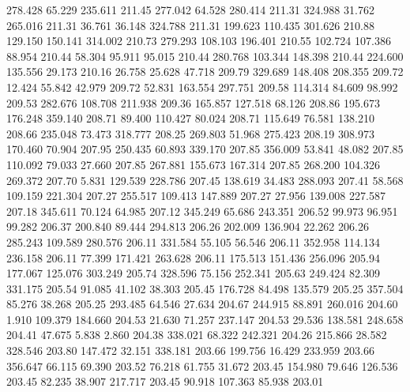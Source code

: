  278.428   65.229  235.611       211.45
 277.042   64.528  280.414       211.31
 324.988   31.762  265.016       211.31
  36.761   36.148  324.788       211.31
 199.623  110.435  301.626       210.88
 129.150  150.141  314.002       210.73
 279.293  108.103  196.401       210.55
 102.724  107.386   88.954       210.44
  58.304   95.911   95.015       210.44
 280.768  103.344  148.398       210.44
 224.600  135.556   29.173       210.16
  26.758   25.628   47.718       209.79
 329.689  148.408  208.355       209.72
  12.424   55.842   42.979       209.72
  52.831  163.554  297.751       209.58
 114.314   84.609   98.992       209.53
 282.676  108.708  211.938       209.36
 165.857  127.518   68.126       208.86
 195.673  176.248  359.140       208.71
  89.400  110.427   80.024       208.71
 115.649   76.581  138.210       208.66
 235.048   73.473  318.777       208.25
 269.803   51.968  275.423       208.19
 308.973  170.460   70.904       207.95
 250.435   60.893  339.170       207.85
 356.009   53.841   48.082       207.85
 110.092   79.033   27.660       207.85
 267.881  155.673  167.314       207.85
 268.200  104.326  269.372       207.70
   5.831  129.539  228.786       207.45
 138.619   34.483  288.093       207.41
  58.568  109.159  221.304       207.27
 255.517  109.413  147.889       207.27
  27.956  139.008  227.587       207.18
 345.611   70.124   64.985       207.12
 345.249   65.686  243.351       206.52
  99.973   96.951   99.282       206.37
 200.840   89.444  294.813       206.26
 202.009  136.904   22.262       206.26
 285.243  109.589  280.576       206.11
 331.584   55.105   56.546       206.11
 352.958  114.134  236.158       206.11
  77.399  171.421  263.628       206.11
 175.513  151.436  256.096       205.94
 177.067  125.076  303.249       205.74
 328.596   75.156  252.341       205.63
 249.424   82.309  331.175       205.54
  91.085   41.102   38.303       205.45
 176.728   84.498  135.579       205.25
 357.504   85.276   38.268       205.25
 293.485   64.546   27.634       204.67
 244.915   88.891  260.016       204.60
   1.910  109.379  184.660       204.53
  21.630   71.257  237.147       204.53
  29.536  138.581  248.658       204.41
  47.675    5.838    2.860       204.38
 338.021   68.322  242.321       204.26
 215.866   28.582  328.546       203.80
 147.472   32.151  338.181       203.66
 199.756   16.429  233.959       203.66
 356.647   66.115   69.390       203.52
  76.218   61.755   31.672       203.45
 154.980   79.646  126.536       203.45
  82.235   38.907  217.717       203.45
  90.918  107.363   85.938       203.01
